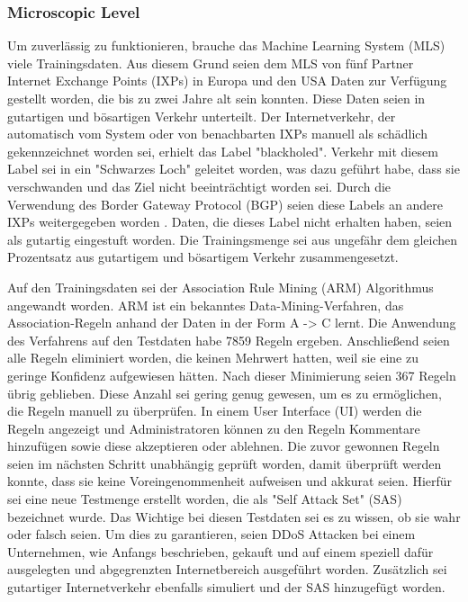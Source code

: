 \documentclass[sigplan,screen]{acmart}
\begin{document}
\subsubsection{Microscopic Level}
Um zuverlässig zu funktionieren, brauche das Machine Learning System (MLS) viele Trainingsdaten. Aus diesem Grund seien dem MLS von fünf Partner Internet Exchange Points (IXPs) in Europa und den USA Daten zur Verfügung gestellt worden, die bis zu zwei Jahre alt sein konnten. 
Diese Daten seien in gutartigen und bösartigen Verkehr unterteilt. Der Internetverkehr, der automatisch vom System oder von benachbarten IXPs manuell als schädlich gekennzeichnet worden sei, erhielt das Label "blackholed". 
Verkehr mit diesem Label sei in ein "Schwarzes Loch" geleitet worden, was dazu geführt habe, dass sie verschwanden und das Ziel nicht beeinträchtigt worden sei. 
Durch die Verwendung des Border Gateway Protocol (BGP) seien diese Labels an andere IXPs weitergegeben worden \cite{blackhole01}.
Daten, die dieses Label nicht erhalten haben, seien als gutartig eingestuft worden. Die Trainingsmenge sei aus ungefähr dem gleichen Prozentsatz aus gutartigem und bösartigem Verkehr zusammengesetzt.

Auf den Trainingsdaten sei der Association Rule Mining (ARM) Algorithmus angewandt worden. ARM ist ein bekanntes Data-Mining-Verfahren, das Association-Regeln anhand der Daten in der Form A -> C lernt. Die Anwendung des Verfahrens auf den Testdaten habe 7859 Regeln ergeben. Anschließend seien alle Regeln eliminiert worden, die keinen Mehrwert hatten, weil sie eine zu geringe Konfidenz aufgewiesen hätten. Nach dieser Minimierung seien 367 Regeln übrig geblieben. Diese Anzahl sei gering genug gewesen, um es zu ermöglichen, die Regeln manuell zu überprüfen. In einem User Interface (UI) werden die Regeln angezeigt und Administratoren können zu den Regeln Kommentare hinzufügen sowie diese akzeptieren oder ablehnen.
Die zuvor gewonnen Regeln seien im nächsten Schritt unabhängig geprüft worden, damit überprüft werden konnte, dass sie keine Voreingenommenheit aufweisen und akkurat seien. Hierfür sei eine neue Testmenge erstellt worden, die als "Self Attack Set" (SAS) bezeichnet wurde. Das Wichtige bei diesen Testdaten sei es zu wissen, ob sie wahr oder falsch seien. Um dies zu garantieren, seien DDoS Attacken bei einem Unternehmen, wie Anfangs beschrieben, gekauft und auf einem speziell dafür ausgelegten und abgegrenzten Internetbereich ausgeführt worden. Zusätzlich sei gutartiger Internetverkehr ebenfalls simuliert und der SAS hinzugefügt worden.
\end{document}
